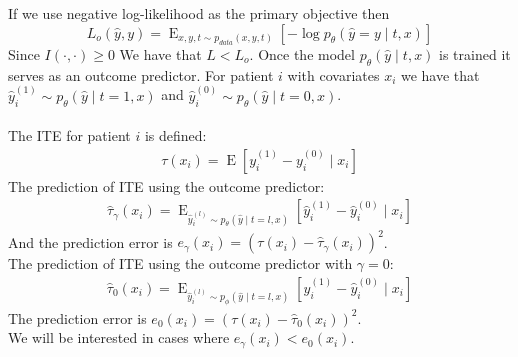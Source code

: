 \documentclass[oneside,12pt]{article}
\begin{document}
%
If we use negative log-likelihood as the primary objective then
\begin{equation}
    L_o(\hat{y}, y) = \operatorname{E}_{x,y,t \sim p_{data}(x,y,t)}\left[-\operatorname{log}p_\theta(\hat{y}=y \mid t,x)\right]    
\end{equation}
%
Since $I(\cdot,\cdot) \geq 0$ We have that $L < L_o$. Once the model $p_\theta(\hat{y} \mid t,x)$ is trained it serves as an outcome predictor. For patient $i$ with covariates $x_i$ we have that $\hat{y}_i^{(1)} \sim p_\theta(\hat{y} \mid t=1,x)$ and $\hat{y}_i^{(0)} \sim p_\theta(\hat{y} \mid t=0,x)$.\\\\
The ITE for patient $i$ is defined:
\begin{equation}
    \begin{split}
        \tau(x_i) = \operatorname{E}\left[y_i^{(1)}-y_i^{(0)} \mid x_i \right]
    \end{split}
\end{equation}
The prediction of ITE using the outcome predictor:
\begin{equation}
    \begin{split}
        \hat{\tau}_\gamma(x_i) = \operatorname{E}_{\hat{y}_i^{(l)} \sim p_\theta(\hat{y} \mid t=l,x)}\left[\hat{y}_i^{(1)}-\hat{y}_i^{(0)} \mid x_i \right]
    \end{split}
\end{equation}
And the prediction error is $e_\gamma(x_i)=\left(\tau(x_i)-\hat{\tau}_\gamma(x_i)\right)^2$.\\
The prediction of ITE using the outcome predictor with $\gamma=0$:
\begin{equation}
    \begin{split}
        \hat{\tau}_0(x_i) = \operatorname{E}_{\hat{y}_i^{(l)} \sim p_\phi(\hat{y} \mid t=l,x)}\left[\hat{y}_i^{(1)}-\hat{y}_i^{(0)} \mid x_i \right]
    \end{split}
\end{equation}
The prediction error is $e_0(x_i)=\left(\tau(x_i)-\hat{\tau}_0(x_i)\right)^2$.\\
We will be interested in cases where $e_\gamma(x_i) < e_0(x_i)$.
%
\end{document}
